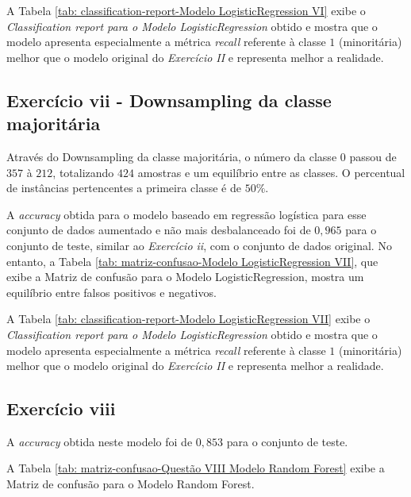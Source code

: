 

A Tabela \ref{tab: classification-report-Modelo LogisticRegression VI} exibe o \textit{Classification report para o Modelo LogisticRegression} obtido e mostra que o modelo apresenta especialmente a métrica \textit{recall} referente à classe $1$ (minoritária) melhor que o modelo original do \textit{Exercício II} e representa melhor a realidade.



\subsection{Exercício vii - Downsampling da classe majoritária}

Através do Downsampling da classe majoritária, o número da classe 0 passou de $357$ à $212$, totalizando $424$ amostras e um equilíbrio entre as classes. O percentual de instâncias pertencentes a primeira classe é de $50\%$.

A \textit{accuracy} obtida para o modelo baseado em regressão logística para esse conjunto de dados aumentado e não mais desbalanceado foi de $0,965$ para o conjunto de teste, similar ao \textit{Exercício ii}, com o conjunto de dados original. No entanto, a Tabela \ref{tab: matriz-confusao-Modelo LogisticRegression VII}, que exibe a Matriz de confusão para o Modelo LogisticRegression, mostra um equilíbrio entre falsos positivos e negativos.



A Tabela \ref{tab: classification-report-Modelo LogisticRegression VII} exibe o \textit{Classification report para o Modelo LogisticRegression} obtido e mostra que o modelo apresenta especialmente a métrica \textit{recall} referente à classe $1$ (minoritária) melhor que o modelo original do \textit{Exercício II} e representa melhor a realidade.



\subsection{Exercício viii}

A \textit{accuracy} obtida neste modelo foi de $0,853$ para o conjunto de teste.

A Tabela \ref{tab: matriz-confusao-Questão VIII Modelo Random Forest} exibe a Matriz de confusão para o Modelo Random Forest.

